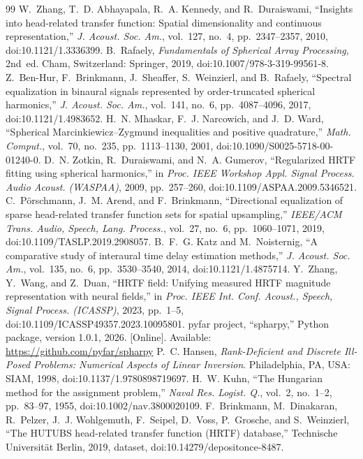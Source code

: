 \documentclass[11pt,a4paper]{article}
\begin{document}
\begin{thebibliography}{99}
 W.~Zhang, T.~D. Abhayapala, R.~A. Kennedy, and R.~Duraiswami, ``Insights into head-related transfer function: Spatial dimensionality and continuous representation,'' \emph{J. Acoust. Soc. Am.}, vol.~127, no.~4, pp.~2347--2357, 2010, doi:10.1121/1.3336399.
 B.~Rafaely, \emph{Fundamentals of Spherical Array Processing}, 2nd~ed. Cham, Switzerland: Springer, 2019, doi:10.1007/978-3-319-99561-8.
 Z.~Ben-Hur, F.~Brinkmann, J.~Sheaffer, S.~Weinzierl, and B.~Rafaely, ``Spectral equalization in binaural signals represented by order-truncated spherical harmonics,'' \emph{J. Acoust. Soc. Am.}, vol.~141, no.~6, pp.~4087--4096, 2017, doi:10.1121/1.4983652.
 H.~N. Mhaskar, F.~J. Narcowich, and J.~D. Ward, ``Spherical Marcinkiewicz--Zygmund inequalities and positive quadrature,'' \emph{Math. Comput.}, vol.~70, no.~235, pp.~1113--1130, 2001, doi:10.1090/S0025-5718-00-01240-0.
 D.~N. Zotkin, R.~Duraiswami, and N.~A. Gumerov, ``Regularized HRTF fitting using spherical harmonics,'' in \emph{Proc. IEEE Workshop Appl. Signal Process. Audio Acoust. (WASPAA)}, 2009, pp.~257--260, doi:10.1109/ASPAA.2009.5346521.
 C.~P\"orschmann, J.~M. Arend, and F.~Brinkmann, ``Directional equalization of sparse head-related transfer function sets for spatial upsampling,'' \emph{IEEE/ACM Trans. Audio, Speech, Lang. Process.}, vol.~27, no.~6, pp.~1060--1071, 2019, doi:10.1109/TASLP.2019.2908057.
 B.~F.~G. Katz and M.~Noisternig, ``A comparative study of interaural time delay estimation methods,'' \emph{J. Acoust. Soc. Am.}, vol.~135, no.~6, pp.~3530--3540, 2014, doi:10.1121/1.4875714.
 Y.~Zhang, Y.~Wang, and Z.~Duan, ``HRTF field: Unifying measured HRTF magnitude representation with neural fields,'' in \emph{Proc. IEEE Int. Conf. Acoust., Speech, Signal Process. (ICASSP)}, 2023, pp.~1--5, doi:10.1109/ICASSP49357.2023.10095801.
 pyfar project, ``spharpy,'' Python package, version 1.0.1, 2026. [Online]. Available: \url{https://github.com/pyfar/spharpy}
 P.~C. Hansen, \emph{Rank-Deficient and Discrete Ill-Posed Problems: Numerical Aspects of Linear Inversion}. Philadelphia, PA, USA: SIAM, 1998, doi:10.1137/1.9780898719697.
 H.~W. Kuhn, ``The Hungarian method for the assignment problem,'' \emph{Naval Res. Logist. Q.}, vol.~2, no.~1--2, pp.~83--97, 1955, doi:10.1002/nav.3800020109.
 F.~Brinkmann, M.~Dinakaran, R.~Pelzer, J.~J. Wohlgemuth, F.~Seipel, D.~Voss, P.~Grosche, and S.~Weinzierl, ``The HUTUBS head-related transfer function (HRTF) database,'' Technische Universit\"at Berlin, 2019, dataset, doi:10.14279/depositonce-8487.

\end{thebibliography}
\end{document}
